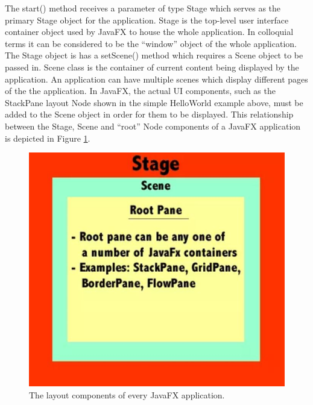 The start() method receives a parameter of type Stage which serves as the primary Stage object for the application. Stage is the top-level user interface container object used by JavaFX to house the whole application. In colloquial terms it can be considered to be the “window” object of the whole application. The Stage object is has a setScene() method which requires a Scene object to be passed in. Scene class is the container of current content being displayed by the application. An application can have multiple scenes which display different pages of the the application. In JavaFX, the actual UI components, such as the StackPane layout Node shown in the simple HelloWorld example above, must be added to the Scene object in order for them to be displayed. This relationship between the Stage, Scene and “root” Node components of a JavaFX application is depicted in Figure \ref{fig:stageSceneRoot}.
\begin{figure}[th]
\centering
\includegraphics[scale=0.5]{Figures/stageSceneRoot.JPG}
\caption{The layout components of every JavaFX application.}
\label{fig:stageSceneRoot}
\end{figure}


